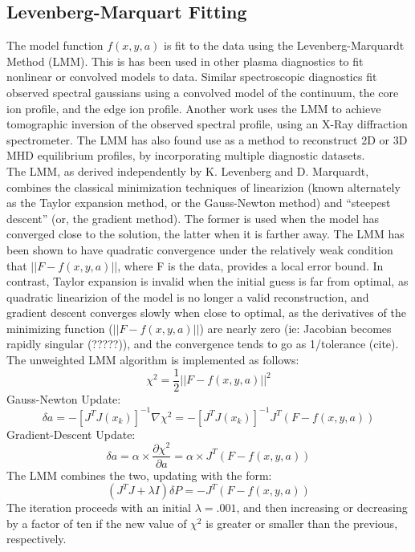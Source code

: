 \documentclass{AIAA}
\begin{document}
\subsection{Levenberg-Marquart Fitting}\label{sec::LM}
\hspace*{4ex}The model function $f(x,y,a)$ is fit to the data using the Levenberg-Marquardt Method (LMM). This is has been used in other plasma diagnostics to fit nonlinear or convolved models to data. Similar spectroscopic diagnostics\cite{Nikolić200167}\cite{Heesterman}\cite{Avdeeva} fit observed spectral gaussians using a convolved model of the continuum, the core ion profile, and the edge ion profile. Another work\cite{Pablant} uses the LMM to achieve tomographic inversion of the observed spectral profile, using an X-Ray diffraction spectrometer\cite{Reinke}. The LMM has also found use as a method to reconstruct 2D\cite{Luxon} or 3D\cite{Lazerson} MHD equilibrium profiles, by incorporating multiple diagnostic datasets.\\
\hspace*{4ex}The LMM, as derived independently by K. Levenberg\cite{LEVENBERG} and D. Marquardt\cite{marquardt1963algorithm}, combines the classical minimization techniques of linearizion (known alternately as the Taylor expansion method, or the Gauss-Newton method) and ``steepest descent'' (or, the gradient method). The former is used when the model has converged close to the solution, the latter when it is farther away. The LMM has been shown to have quadratic convergence\cite{Fan2005} under the relatively weak condition that $||F-f(x,y,a)||$, where F is the data, provides a local error bound. In contrast, Taylor expansion is invalid when the initial guess is far from optimal, as quadratic linearizion of the model is no longer a valid reconstruction, and gradient descent converges slowly when close to optimal, as the derivatives of the minimizing function ($||F-f(x,y,a)||$) are nearly zero (ie: Jacobian becomes rapidly singular (?????)), and the convergence tends to go as 1/tolerance (cite). The unweighted LMM algorithm is implemented as follows\cite{press1996numerical}\cite{nocedal2006numerical}:\\
\begin{equation}
\chi^2 = \frac{1}{2}||F-f(x,y,a)||^2
\end{equation}
Gauss-Newton Update:
\begin{equation}
\delta{a} = -[J^TJ(x_k)]^{-1}\nabla{\chi^2} = -[J^TJ(x_k)]^{-1}{J^T}(F-f(x,y,a))
\end{equation}
Gradient-Descent Update:
\begin{equation}
\delta{a} = \alpha\times\frac{\partial\chi^2}{\partial{a}} = \alpha\times{J^T}(F-f(x,y,a))
\end{equation}
The LMM combines the two, updating with the form:
\begin{equation}
(J^TJ+\lambda{I})\delta{P}=-J^T(F-f(x,y,a))
\end{equation}
The iteration proceeds with an initial $\lambda=.001$, and then increasing or decreasing by a factor of ten if the new value of $\chi^2$ is greater or smaller than the previous, respectively.
\end{document}
